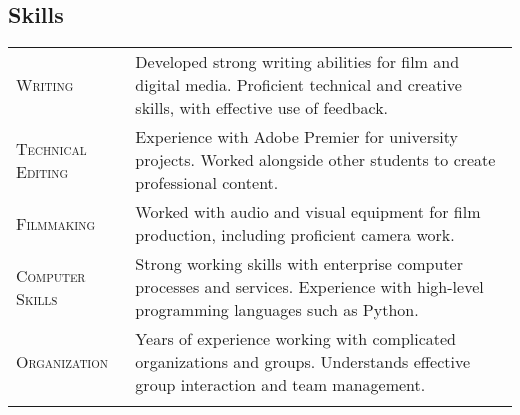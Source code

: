 \documentclass[a4paper, oneside, final]{scrartcl} %
\begin{document}
\begin{center}

\section{Skills}

\begin{tabularx}{0.97\linewidth}{>{\raggedleft\scshape}p{2cm}X}
	Writing& Developed strong writing abilities for film and digital media. Proficient technical and creative skills, with effective use of feedback.\\
\arrayrulecolor{gray}\hline
	Technical Editing& Experience with Adobe Premier for university projects. Worked alongside other students to create professional content.\\
\arrayrulecolor{gray}\hline
	Filmmaking & Worked with audio and visual equipment for film production, including proficient camera work.\\
\arrayrulecolor{gray}\hline
	Computer Skills& Strong working skills with enterprise computer processes and services. Experience with high-level programming languages such as Python.\\
\arrayrulecolor{gray}\hline
	Organization & Years of experience working with complicated organizations and groups. Understands effective group interaction and team management.\\
\arrayrulecolor{gray}\hline
\end{tabularx}



\end{center}
\end{document}
